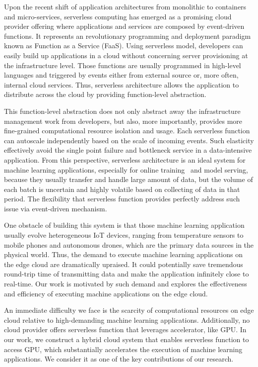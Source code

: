 Upon the recent shift of application architectures from monolithic to containers and micro-services, serverless computing has emerged as a promising cloud provider offering where applications and services are composed by event-driven functions. It represents an revolutionary programming and deployment paradigm known as Function as a Service (FaaS). Using serverless model, developers can easily build up applications in a cloud without concerning server provisioning at the infrastructure level. Those functions are usually programmed in high-level languages and triggered by events either from external source or, more often, internal cloud services. Thus, serverless architecture allows the application to distribute across the cloud by providing function-level abstraction.

This function-level abstraction does not only abstract away the infrastructure management work from developers, but also, more importantly, provides more fine-grained computational resource isolation and usage. Each serverless function can autoscale independently based on the scale of incoming events. Such elasticity effectively avoid the single point failure and bottleneck service in a data-intensive application. From this perspective, serverless architecture is an ideal system for machine learning applications, especially for online training~\cite{ref:online} and model serving, because they usually transfer and handle large amount of data, but the volume of each batch is uncertain and highly volatile based on collecting of data in that period. The flexibility that serverless function provides perfectly address such issue via event-driven mechanism. 

One obstacle of building this system is that those machine learning application usually evolve heterogeneous IoT devices, ranging from temperature sensors to mobile phones and autonomous drones, which are the primary data sources in the physical world. Thus, the demand to execute machine learning applications on the edge cloud are dramatically upraised. It could potentially save tremendous round-trip time of transmitting data and make the application infinitely close to real-time. Our work is motivated by such demand and explores the effectiveness and efficiency of executing machine applications on the edge cloud. 

An immediate difficulty we face is the scarcity of computational resources on edge cloud relative to high-demanding machine learning applications. Additionally, no cloud provider offers serverless function that leverages accelerator, like GPU. In our work, we construct a hybrid cloud system that enables serverless function to access GPU, which substantially accelerates the execution of machine learning applications. We consider it as one of the key contributions of our research.

